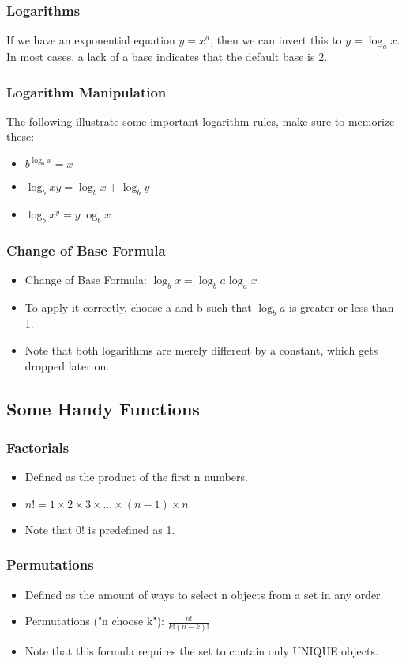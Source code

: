 \subsubsection{Logarithms}
If we have an exponential equation $y=x^a$, then we can invert this to $y=\log_a{x}$. In most cases, a lack of a base indicates that the default base is 2.
\subsubsection{Logarithm Manipulation}
The following illustrate some important logarithm rules, make sure to memorize these:
\begin{itemize}
    \item $b^{\log_b{x}}=x$
    \item $\log_b{xy}=\log_b{x}+\log_b{y}$
    \item $\log_b{x^y}=y\log_b{x}$
\end{itemize}
\subsubsection{Change of Base Formula}
\begin{itemize}
    \item Change of Base Formula: $\log_b{x} = \log_b{a}\log_a{x}$
    \item To apply it correctly, choose a and b such that $\log_b{a}$ is greater or less than 1.
    \item Note that both logarithms are merely different by a constant, which gets dropped later on.
\end{itemize}
\subsection{Some Handy Functions}
\subsubsection{Factorials}
\begin{itemize}
    \item Defined as the product of the first n numbers.
    \item $n!=1\times2\times3\times...\times(n-1)\times n$
    \item Note that $0!$ is predefined as 1.
\end{itemize}
\subsubsection{Permutations}
\begin{itemize}
    \item Defined as the amount of ways to select n objects from a set in any order.
    \item Permutations ("n choose k"): $\frac{n!}{k!(n-k)!}$
    \item Note that this formula requires the set to contain only UNIQUE objects.
\end{itemize}

